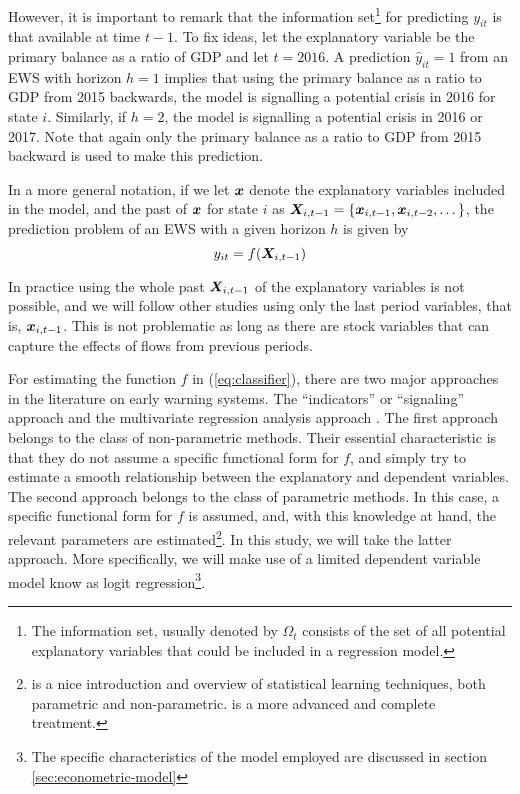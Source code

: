 However, it is important to remark that the information set\footnote{The information set, usually denoted by $\Omega_t$ consists of the set of all potential explanatory variables that could be included in a regression model.} for predicting $y_{it}$ is that available at time $t-1$. To fix ideas, let the explanatory variable be the primary balance as a ratio of GDP and let $t = 2016$. A prediction $\hat{y}_{it} = 1$ from an EWS with horizon $h = 1$ implies that using the primary balance as a ratio to GDP from 2015 backwards, the model is signalling a potential crisis in 2016 for state $i$. Similarly, if $h = 2$, the model is signalling a potential crisis in 2016 or 2017. Note that again only the primary balance as a ratio to GDP from 2015 backward is used to make this prediction. 

In a more general notation, if we let $\bm x$ denote the explanatory variables included in the model, and the past of $\bm x$ for state $i$ as $\bm X_{i,t-1} = \{\bm x_{i,t-1}, \bm x_{i,t-2}, \dots \}$, the prediction problem of an EWS with a given horizon $h$ is given by
\begin{equation}
\label{eq:classifier}
y_{it} = f(\bm X_{i,t-1})
\end{equation}

In practice using the whole past $\bm X_{i,t-1}$ of the explanatory variables is not possible, and we will follow other studies using only the last period variables, that is, $\bm x_{i, t-1}$. This is not problematic as long as there are stock variables that can capture the effects of flows from previous periods.

For estimating the function $f$ in (\ref{eq:classifier}),  there are two major approaches in the literature on early warning systems. The ``indicators'' or ``signaling'' approach and the multivariate regression analysis approach \citep[pg. 5]{baldacci2011b}. The first approach belongs to the class of non-parametric methods. Their essential characteristic is that they do not assume a specific functional form for $f$, and simply try to estimate a smooth relationship between the explanatory and dependent variables. The second approach belongs to the class of parametric methods. In this case, a specific functional form for $f$ is assumed, and, with this knowledge at hand, the relevant parameters are estimated\footnote{\citet{james2013} is a nice introduction and overview of statistical learning techniques, both parametric and non-parametric. \citet{hastie2009} is a more advanced and complete treatment.}. In this study, we will take the latter approach. More specifically, we will make use of a limited dependent variable model know as logit regression\footnote{The specific characteristics of the model employed are discussed in section \ref{sec:econometric-model}}. 

